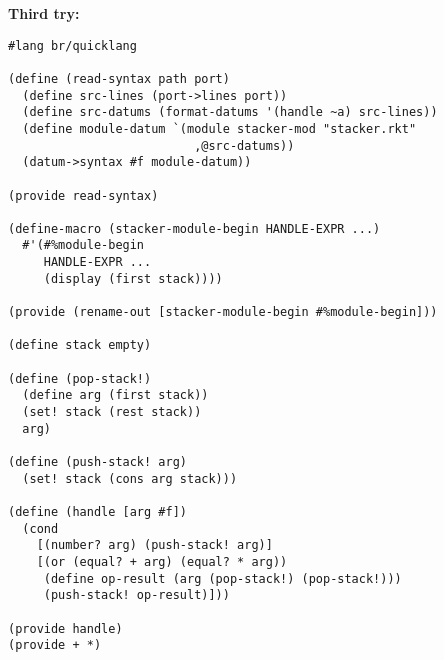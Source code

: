 \textbf{Third try:}
\begin{lstlisting}[language=racket]
#lang br/quicklang

(define (read-syntax path port)
  (define src-lines (port->lines port))
  (define src-datums (format-datums '(handle ~a) src-lines))
  (define module-datum `(module stacker-mod "stacker.rkt"
                          ,@src-datums))
  (datum->syntax #f module-datum))

(provide read-syntax)

(define-macro (stacker-module-begin HANDLE-EXPR ...)
  #'(#%module-begin
     HANDLE-EXPR ...
     (display (first stack))))

(provide (rename-out [stacker-module-begin #%module-begin]))

(define stack empty)

(define (pop-stack!)
  (define arg (first stack))
  (set! stack (rest stack))
  arg)

(define (push-stack! arg)
  (set! stack (cons arg stack)))

(define (handle [arg #f])
  (cond
    [(number? arg) (push-stack! arg)]
    [(or (equal? + arg) (equal? * arg))
     (define op-result (arg (pop-stack!) (pop-stack!)))
     (push-stack! op-result)]))

(provide handle)
(provide + *)
\end{lstlisting}